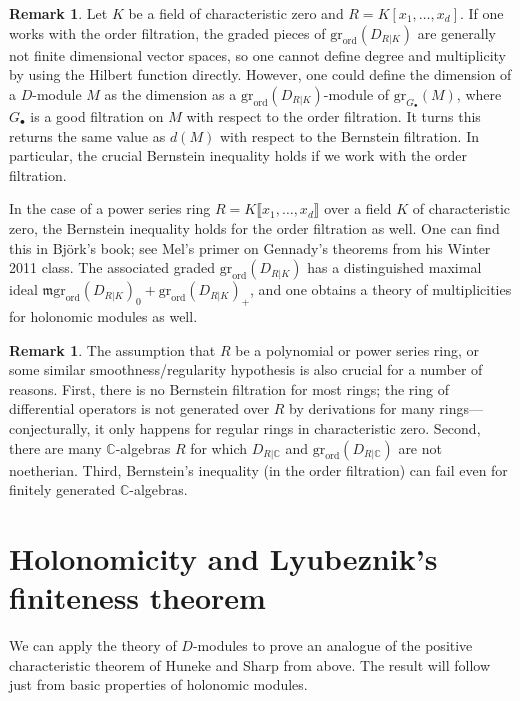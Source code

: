 \documentclass[11pt]{book}
\numberwithin{equation}{section}
\numberwithin{theorem}{chapter}
\theoremstyle{definition}
\newtheorem*{basic properties}{Basic Properties}
\newtheorem*{Important Remark}{Important Remark}
\newtheorem{remark}[theorem]{Remark}
\theoremstyle{remark}
\newcommand{\CC}{\mathbb{C}}
\newcommand{\m}{\mathfrak{m}}
\begin{document}
\begin{remark}
	Let $K$ be a field of characteristic zero and $R=K[x_1,\dots,x_d]$. If one works with the order filtration, the graded pieces of $\mathrm{gr}_{\mathrm{ord}}(D_{R|K})$ are generally not finite dimensional vector spaces, so one cannot define degree and multiplicity by using the Hilbert function directly. However, one could define the dimension of a $D$-module $M$ as the dimension as a $\mathrm{gr}_{\mathrm{ord}}(D_{R|K})$-module of $\mathrm{gr}_{G_\bullet}(M)$, where $G_\bullet$ is a good filtration on $M$ with respect to the order filtration. It turns this returns the same value as $d(M)$ with respect to the Bernstein filtration. In particular, the crucial Bernstein inequality holds if we work with the order filtration.
	
	In the case of a power series ring $R=K\llbracket x_1,\dots,x_d\rrbracket$ over a field $K$ of characteristic zero, the Bernstein inequality holds for the order filtration as well. One can find this in Bj\"ork's book; see Mel's primer on Gennady's theorems from his Winter 2011 class. The associated graded $\mathrm{gr}_{\mathrm{ord}}(D_{R|K})$ has a distinguished maximal ideal $\m \mathrm{gr}_{\mathrm{ord}}(D_{R|K})_0 +\mathrm{gr}_{\mathrm{ord}}(D_{R|K})_+$, and one obtains a theory of multiplicities for holonomic modules as well.
\end{remark}

\begin{remark}
	The assumption that $R$ be a polynomial or power series ring, or some similar smoothness/regularity hypothesis is also crucial for a number of reasons. First, there is no Bernstein filtration for most rings; the ring of differential operators is not generated over $R$ by derivations for many rings---conjecturally, it only happens for regular rings in characteristic zero. Second, there are many $\CC$-algebras $R$ for which $D_{R|\CC}$ and $\mathrm{gr}_{\mathrm{ord}}(D_{R|\CC})$ are not noetherian. Third, Bernstein's inequality (in the order filtration) can fail even for finitely generated $\CC$-algebras.
\end{remark}


\section{Holonomicity and Lyubeznik's finiteness theorem}

We can apply the theory of $D$-modules to prove an analogue of the positive characteristic theorem of Huneke and Sharp from above. The result will follow just from basic properties of holonomic modules.
\end{document}
